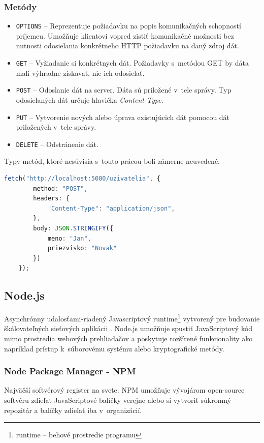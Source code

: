 \subsubsection{Metódy}
\begin{itemize}
	\item \texttt{OPTIONS} -- Reprezentuje požiadavku na popis komunikačných schopností príjemcu. Umožňuje klientovi vopred zistiť komunikačné možnosti bez nutnosti odosielania konkrétneho HTTP požiadavku na daný zdroj dát. \cite{MDN}
	\item \texttt{GET} -- Vyžiadanie si konkrétnych dát. Požiadavky s~metódou GET by dáta mali výhradne získavať, nie ich odosielať. \cite{MDN}
	\item \texttt{POST} -- Odoslanie dát na server. Dáta sú priložené v~tele správy. Typ odosielaných dát určuje hlavička \emph{Content-Type}. \cite{MDN}
	\item \texttt{PUT} -- Vytvorenie nových alebo úprava existujúcich dát pomocou dát priložených v~tele správy. \cite{MDN}
	\item \texttt{DELETE} -- Odstránenie dát. \cite{MDN}
\end{itemize}

\noindent Typy metód, ktoré nesúvisia s~touto prácou boli zámerne neuvedené. \\

\begin{lstlisting}[language=TypeScript, caption=Príklad odoslania HTTP POST metódy v~prostredí TypeScript.]
	fetch("http://localhost:5000/uzivatelia", {
		method: "POST",
		headers: {
			"Content-Type": "application/json",
		},
		body: JSON.STRINGIFY({
			meno: "Jan",
			priezvisko: "Novak"
		})
	});
\end{lstlisting}

\subsection{Node.js}
\label{subsection:nodejs}
Asynchrónny udalosťami-riadený Javascriptový runtime\footnote{runtime -- behové prostredie programu} vytvorený pre budovanie škálovateľných sieťových aplikácii \cite{NodeJS}. Node.js umožňuje spustiť JavaScriptový kód mimo prostredia webových prehliadačov a poskytuje rozšírené funkcionality ako napríklad prístup k~súborovému systému alebo kryptografické metódy.

\subsubsection{Node Package Manager - NPM}
Najväčší softvérový register na svete. NPM umožňuje vývojárom open-source softvéru zdieľať JavaScriptové balíčky verejne alebo si vytvoriť súkromný repozitár a balíčky zdieľať iba v~organizácií. \cite{NPM} \\

